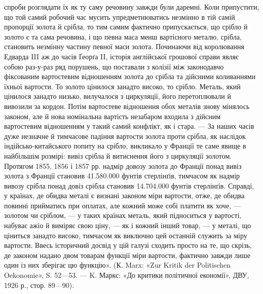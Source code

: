 спроби розглядати їх як ту саму речовину завжди були даремні. Коли припустити, що той самий робочий
час мусить упредметнюватись незмінно в тій самій пропорції золота й срібла, то тим самим фактично
припускається, що срібло й золото є та сама речовина, і що певна маса менш вартісного металю,
срібла, становить незмінну частину певної маси золота. Починаючи від королювання Едварда III аж до
часів Ґеорґа II, історія англійської грошової справи являє собою раз-у-раз ряд порушень, що
поставали з колізії між законодавчо фіксованим вартостевим відношенням
золота до срібла та дійсними коливаннями їхньої вартости. То золото цінилося занадто високо, то
срібло. Металь, який цінилося занадто низько, вилучалося з циркуляції, його перетоплювали й вивозили
за кордон. Потім вартостеве відношення обох металів знову мінялось законом, але й нова номінальна
вартість незабаром входила з дійсним вартостевим відношенням у такий самий конфлікт, як і стара. —
За наших часів дуже
незначне й тимчасове падіння вартости золота проти срібла, як наслідок індійсько-китайського попиту
на срібло, викликало у Франції те саме явище в найбільшім розмірі: вивіз срібла й витиснення його з
циркуляції золотом. Протягом 1855, 1856 і 1857 рр. надмір довозу золота до Франції понад вивіз
золота з Франції становив 41.580.000 фунтів стерлінґів, тимчасом як надмір вивозу срібла понад довіз
срібла становив 14.704.000 фунтів стерлінґів. Справді, у країнах, де обидва металі є визнані законом
міри вартости, отже, де обидва повинні прийматись при оплатах, але кожний може собі платити як хоче,
— золотом чи сріблом, — у таких країнах металь, який підноситься у вартості, набуває ажіо й виміряє
свою ціну, — як і кожний інший товар, — у металі, що ціниться занадто високо, тимчасом як виключно
цей останній служить за міру вартости. Ввесь історичний досвід у цій галузі сходить просто на те, що
скрізь, де законом надано двом товарам функції міри вартости, фактично завжди лише один із них
зберігає цю функцію». (К. Marx: «Zur Kritik der Politischen Oekonomie», S. 52—53. — K. Маркс: «До
критики політичної економії», ДВУ, 1926 р., стор. 89—90).